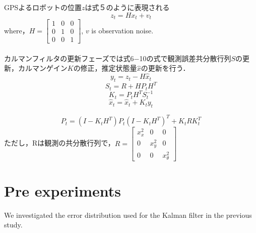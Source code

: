 \documentclass[a4paper]{article}
\begin{document}
%
%
GPSよるロボットの位置$z$は式５のように表現される
\begin{equation}
    z_{t} = Hx_{t} + v_{t}
    \label{eq:5}
\end{equation}
where，$H = \begin{bmatrix} 1 & 0 & 0 \\  0 & 1 & 0 \\  0 & 0 & 1 \end{bmatrix}$, 
$v$ is observation noise. \\ \\
カルマンフィルタの更新フェーズでは式6−10の式で観測誤差共分散行列$S$の更新，カルマンゲイン$K$の修正，推定状態量$\hat{x}$の更新を行う．
\begin{equation}
    y_{t} = z_{t} - H\hat{x}_{t}
    \label{eq:6}
\end{equation}
%
%
\begin{equation}
    S_{t} = R + HP_{t}H^{T}
    \label{eq:7}
\end{equation}
%
%
\begin{equation}
K_{t} = P_{t}H^{T}S_{t}^{-1}
    \label{eq:8}
\end{equation}
\begin{equation}
    \hat{x}_{t} = \hat{x}_{t}+K_{t}y_{t}
    \label{eq:8}
\end{equation}

\begin{equation}
    P_{t} = (I-K_{t}H^{T})P_{t}(I-K_{t}H^{T})^{T} + K_{t}RK_{t}^{T}
    \label{eq:9}
\end{equation}
%
ただし，Rは観測の共分散行列で，$R = \begin{bmatrix} x_{x}^{2} & 0 & 0 \\  0 & x_{y}^{2} & 0 \\  0 & 0 & x_{\theta}^{2} \end{bmatrix}$\\



\section{Pre experiments}
We investigated the error distribution used for the Kalman filter in the previous study.
\end{document}
